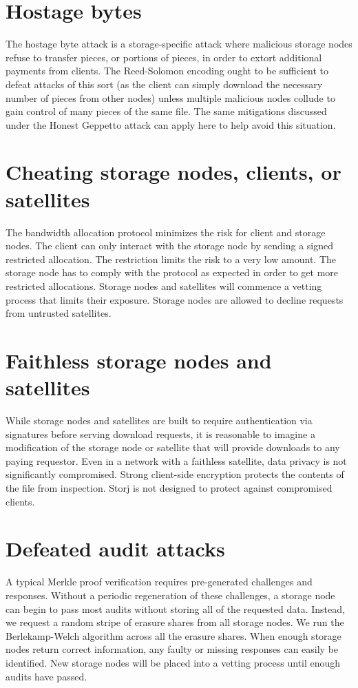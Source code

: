 \documentclass[11pt,fleqn,openany]{book}
\begin{document}
\section{Hostage bytes}

The hostage byte attack is a storage-specific attack where malicious storage
nodes
refuse to transfer pieces, or portions of pieces, in order to extort additional
payments from clients. The Reed-Solomon encoding ought to be sufficient to
defeat attacks of this sort (as the client can simply download the necessary
number of pieces from other nodes) unless multiple malicious nodes collude to
gain control of many pieces of the same file. The same mitigations discussed
under the Honest Geppetto attack can apply here to help avoid this situation.

\section{Cheating storage nodes, clients, or satellites}

The bandwidth allocation protocol minimizes the risk for client and storage
nodes.
The client can only interact with the storage node by sending a signed
restricted allocation.
The restriction limits the risk to a very low amount.
The storage node has to comply with the protocol as expected in order to get
more restricted allocations.
Storage nodes and satellites will commence a vetting process that limits their
exposure.
Storage nodes are allowed to decline requests from untrusted satellites.

\section{Faithless storage nodes and satellites}

While storage nodes and satellites are built to require authentication via
signatures before serving download requests, it is reasonable to imagine a
modification of the storage node or satellite that will provide downloads to
any paying requestor.
Even in a network with a faithless satellite, data privacy is not significantly
compromised.
Strong client-side encryption protects the contents of the file from
inspection.
Storj is not designed to protect against compromised clients.

\section{Defeated audit attacks}

A typical Merkle proof verification requires pre-generated challenges and
responses.
Without a periodic regeneration of these challenges, a storage node can begin
to pass most audits without storing all of the requested data.
Instead, we request a random stripe of erasure shares from all storage nodes.
We run the Berlekamp-Welch algorithm\cite{bw} across all the
erasure shares.
When enough storage nodes return correct information, any faulty or missing
responses can easily be identified.
New storage nodes will be placed into a vetting process until enough audits
have passed.

\newpage

\begingroup
\raggedright

\endgroup
\end{document}
